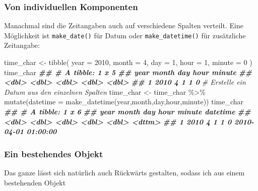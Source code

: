 \documentclass[
]{article}
\newenvironment{Shaded}{\begin{snugshade}}{\end{snugshade}}
\newcommand{\AttributeTok}[1]{\textcolor[rgb]{0.77,0.63,0.00}{#1}}
\newcommand{\CommentTok}[1]{\textcolor[rgb]{0.56,0.35,0.01}{\textit{#1}}}
\newcommand{\DecValTok}[1]{\textcolor[rgb]{0.00,0.00,0.81}{#1}}
\newcommand{\DocumentationTok}[1]{\textcolor[rgb]{0.56,0.35,0.01}{\textbf{\textit{#1}}}}
\newcommand{\FunctionTok}[1]{\textcolor[rgb]{0.00,0.00,0.00}{#1}}
\newcommand{\NormalTok}[1]{#1}
\newcommand{\OtherTok}[1]{\textcolor[rgb]{0.56,0.35,0.01}{#1}}
\newcommand{\SpecialCharTok}[1]{\textcolor[rgb]{0.00,0.00,0.00}{#1}}
\begin{document}
\hypertarget{von-individuellen-komponenten}{%
\subsubsection{Von individuellen Komponenten}\label{von-individuellen-komponenten}}

Manachmal sind die Zeitangaben auch auf verschiedene Spalten verteilt. Eine Möglichkeit ist \texttt{make\_date()} für Datum oder \texttt{make\_datetime()} für zusätzliche Zeitangabe:

\begin{Shaded}
\begin{Highlighting}[]
\NormalTok{time\_char }\OtherTok{\textless{}{-}} \FunctionTok{tibble}\NormalTok{(}
  \AttributeTok{year =} \DecValTok{2010}\NormalTok{,}
  \AttributeTok{month =} \DecValTok{4}\NormalTok{,}
  \AttributeTok{day =} \DecValTok{1}\NormalTok{, }
  \AttributeTok{hour =} \DecValTok{1}\NormalTok{,}
  \AttributeTok{minute =} \DecValTok{0}
\NormalTok{)}
\NormalTok{time\_char}
\DocumentationTok{\#\# \# A tibble: 1 x 5}
\DocumentationTok{\#\#    year month   day  hour minute}
\DocumentationTok{\#\#   \textless{}dbl\textgreater{} \textless{}dbl\textgreater{} \textless{}dbl\textgreater{} \textless{}dbl\textgreater{}  \textless{}dbl\textgreater{}}
\DocumentationTok{\#\# 1  2010     4     1     1      0}
\CommentTok{\# Erstelle ein Datum aus den einzelnen Spalten}
\NormalTok{time\_char }\OtherTok{\textless{}{-}}\NormalTok{ time\_char }\SpecialCharTok{\%\textgreater{}\%}
  \FunctionTok{mutate}\NormalTok{(}\AttributeTok{datetime =} \FunctionTok{make\_datetime}\NormalTok{(year,month,day,hour,minute))}
\NormalTok{time\_char}
\DocumentationTok{\#\# \# A tibble: 1 x 6}
\DocumentationTok{\#\#    year month   day  hour minute datetime           }
\DocumentationTok{\#\#   \textless{}dbl\textgreater{} \textless{}dbl\textgreater{} \textless{}dbl\textgreater{} \textless{}dbl\textgreater{}  \textless{}dbl\textgreater{} \textless{}dttm\textgreater{}             }
\DocumentationTok{\#\# 1  2010     4     1     1      0 2010{-}04{-}01 01:00:00}
\end{Highlighting}
\end{Shaded}

\hypertarget{ein-bestehendes-objekt}{%
\subsubsection{Ein bestehendes Objekt}\label{ein-bestehendes-objekt}}

Das ganze lässt sich natürlich auch Rückwärts gestalten, sodass ich aus einem bestehenden Objekt
\end{document}
